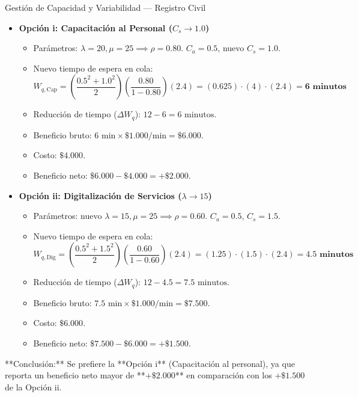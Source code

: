 \documentclass[11pt, a4paper]{article}
\begin{document}
\begin{ejercicio}{Gestión de Capacidad y Variabilidad --- Registro Civil}
  \begin{itemize}
    \item \textbf{Opción i: Capacitación al Personal ($C_s \to 1.0$)}
      \begin{itemize}
        \item Parámetros: $\lambda = 20, \mu = 25 \implies \rho = 0.80$. $C_a = 0.5$, nuevo $C_s = 1.0$.
        \item Nuevo tiempo de espera en cola:
          \[
            W_{q,\text{Cap}} = \left( \frac{0.5^2 + 1.0^2}{2} \right) \left( \frac{0.80}{1 - 0.80} \right) (2.4) = (0.625) \cdot (4) \cdot (2.4) = \mathbf{6 \text{ minutos}}
          \]
        \item Reducción de tiempo ($\Delta W_q$): $12 - 6 = 6 \text{ minutos}$.
        \item Beneficio bruto: $6 \text{ min} \times \$1.000/\text{min} = \$6.000$.
        \item Costo: $\$4.000$.
        \item Beneficio neto: $\$6.000 - \$4.000 = \mathbf{+\$2.000}$.
      \end{itemize}

    \item \textbf{Opción ii: Digitalización de Servicios ($\lambda \to 15$)}
      \begin{itemize}
        \item Parámetros: nuevo $\lambda = 15, \mu = 25 \implies \rho = 0.60$. $C_a = 0.5$, $C_s = 1.5$.
        \item Nuevo tiempo de espera en cola:
          \[
            W_{q,\text{Dig}} = \left( \frac{0.5^2 + 1.5^2}{2} \right) \left( \frac{0.60}{1 - 0.60} \right) (2.4) = (1.25) \cdot (1.5) \cdot (2.4) = \mathbf{4.5 \text{ minutos}}
          \]
        \item Reducción de tiempo ($\Delta W_q$): $12 - 4.5 = 7.5 \text{ minutos}$.
        \item Beneficio bruto: $7.5 \text{ min} \times \$1.000/\text{min} = \$7.500$.
        \item Costo: $\$6.000$.
        \item Beneficio neto: $\$7.500 - \$6.000 = \mathbf{+\$1.500}$.
      \end{itemize}
  \end{itemize}

  **Conclusión:** Se prefiere la **Opción i** (Capacitación al personal), ya que reporta un beneficio neto mayor de **$+\$2.000$** en comparación con los $+\$1.500$ de la Opción ii.
\end{ejercicio}
\end{document}
